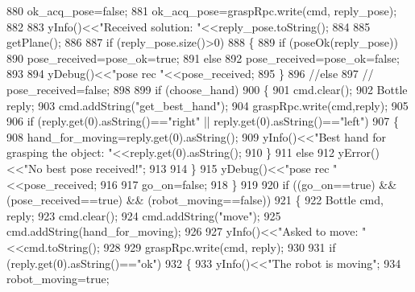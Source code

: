 \begin{DoxyCode}
880             ok\_acq\_pose=\textcolor{keyword}{false};
881             ok\_acq\_pose=graspRpc.write(cmd, reply\_pose);
882 
883             yInfo()<<\textcolor{stringliteral}{"Received solution: "}<<reply\_pose.toString();
884 
885             getPlane();
886 
887             \textcolor{keywordflow}{if} (reply\_pose.size()>0)
888             \{
889                 \textcolor{keywordflow}{if} (poseOk(reply\_pose))
890                     pose\_received=pose\_ok=\textcolor{keyword}{true};
891                 \textcolor{keywordflow}{else}
892                     pose\_received=pose\_ok=\textcolor{keyword}{false};
893                 
894                 yDebug()<<\textcolor{stringliteral}{"pose rec "}<<pose\_received;
895             \}
896             \textcolor{comment}{//else}
897             \textcolor{comment}{//    pose\_received=false;}
898 
899             \textcolor{keywordflow}{if} (choose\_hand)
900             \{
901                 cmd.clear();
902                 Bottle reply;
903                 cmd.addString(\textcolor{stringliteral}{"get\_best\_hand"});
904                 graspRpc.write(cmd,reply);
905 
906                 \textcolor{keywordflow}{if} (reply.get(0).asString()==\textcolor{stringliteral}{"right"} || reply.get(0).asString()==\textcolor{stringliteral}{"left"})
907                 \{
908                     hand\_for\_moving=reply.get(0).asString();
909                     yInfo()<<\textcolor{stringliteral}{"Best hand for grasping the object: "}<<reply.get(0).asString();
910                 \}
911                 \textcolor{keywordflow}{else}
912                     yError()<<\textcolor{stringliteral}{"No best pose received!"};
913 
914             \}
915             yDebug()<<\textcolor{stringliteral}{"pose rec "}<<pose\_received;
916 
917             go\_on=\textcolor{keyword}{false};
918         \}
919 
920         \textcolor{keywordflow}{if} ((go\_on==\textcolor{keyword}{true}) && (pose\_received==\textcolor{keyword}{true}) && (robot\_moving==\textcolor{keyword}{false}))
921         \{
922             Bottle cmd, reply;
923             cmd.clear();
924             cmd.addString(\textcolor{stringliteral}{"move"});
925             cmd.addString(hand\_for\_moving);
926 
927             yInfo()<<\textcolor{stringliteral}{"Asked to move: "}<<cmd.toString();
928 
929             graspRpc.write(cmd, reply);
930 
931             \textcolor{keywordflow}{if} (reply.get(0).asString()==\textcolor{stringliteral}{"ok"})
932             \{
933                 yInfo()<<\textcolor{stringliteral}{"The robot is moving"};
934                 robot\_moving=\textcolor{keyword}{true};

\end{DoxyCode}
